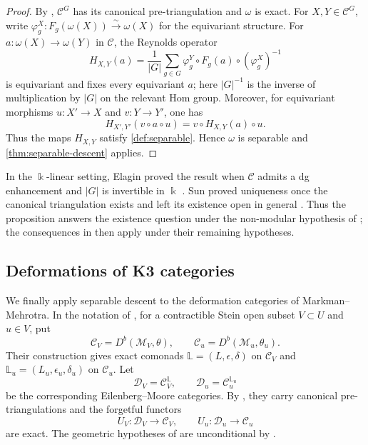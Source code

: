 \documentclass[a4paper,11pt,reqno]{amsart}
\theoremstyle{definition}
\theoremstyle{plain}
\numberwithin{equation}{section}
\newcommand{\C}{\mathcal C}
\newcommand{\D}{\mathcal D}
\newcommand{\kk}{\Bbbk}
\begin{document}
\begin{proof}
By \cite[Proposition~3.3]{Sun2019}, $\C^G$ has its canonical
pre-triangulation and $\omega$ is exact.  For $X,Y\in\C^G$, write
\(\varphi_g^X:F_g(\omega(X))\xrightarrow{\sim}\omega(X)\) for the
equivariant structure.  For $a:\omega(X)\to\omega(Y)$ in \(\C\), the
Reynolds operator
\[
 H_{X,Y}(a)=\frac1{|G|}\sum_{g\in G}
 \varphi_g^Y\circ F_g(a)\circ(\varphi_g^X)^{-1}
\]
is equivariant and fixes every equivariant \(a\); here \(|G|^{-1}\) is the
inverse of multiplication by \(|G|\) on the relevant Hom group.  Moreover,
for equivariant morphisms \(u:X'\to X\) and \(v:Y\to Y'\), one has
\[
 H_{X',Y'}(v\circ a\circ u)=v\circ H_{X,Y}(a)\circ u.
\]
Thus the maps \(H_{X,Y}\) satisfy \cref{def:separable}.  Hence \(\omega\)
is separable and
\cref{thm:separable-descent} applies.
\end{proof}

In the \(\kk\)-linear setting, Elagin proved the result when \(\C\)
admits a dg enhancement and \(|G|\) is invertible in \(\kk\)
\cite[Corollary~6.10]{Elagin2014}.
Sun proved uniqueness once the canonical triangulation exists and left its
existence open in general \cite[Corollary~3.6 and the paragraph following
Example~3.8]{Sun2019}.  Thus the proposition answers the existence question
under the non-modular hypothesis of \cite[Proposition~3.3]{Sun2019}; the
consequences in \cite[Sections~3.3--3.5]{Sun2019} then apply under their
remaining hypotheses.

\subsection{Deformations of K3 categories}

We finally apply separable descent to the deformation categories of
Markman--Mehrotra.  In the notation of
\cite[Theorem~1.8]{MarkmanMehrotra2015}, for a contractible Stein open
subset \(V\subset U\) and \(u\in V\), put
\[
 \C_V=D^b(\mathcal M_V,\theta),
 \qquad
 \C_u=D^b(\mathcal M_u,\theta_u).
\]
Their construction gives exact comonads
\(\mathbb L=(L,\epsilon,\delta)\) on \(\C_V\) and
\(\mathbb L_u=(L_u,\epsilon_u,\delta_u)\) on \(\C_u\).  Let
\[
 \D_V=\C_V^{\mathbb L},
 \qquad
 \D_u=\C_u^{\mathbb L_u}
\]
be the corresponding Eilenberg--Moore categories.  By
\cite[Theorem~1.8(3) and Remark~6.12]{MarkmanMehrotra2015}, they carry
canonical pre-triangulations and the forgetful functors
\[
 U_V:\D_V\longrightarrow\C_V,
 \qquad
 U_u:\D_u\longrightarrow\C_u
\]
are exact.  The geometric hypotheses of
\cite[Theorem~1.8]{MarkmanMehrotra2015} are unconditional by
\cite[Theorem~1.11]{MarkmanMehrotraVerbitsky2019}.
\end{document}
